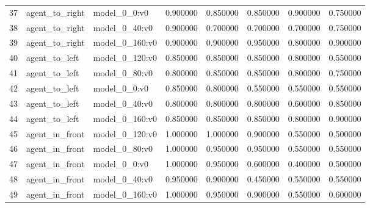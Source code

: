 \begin{tabular}{lllrrrrr}
37 & agent\_to\_right & model\_0\_0:v0 & 0.900000 & 0.850000 & 0.850000 & 0.900000 & 0.750000 \\
38 & agent\_to\_right & model\_0\_40:v0 & 0.900000 & 0.700000 & 0.700000 & 0.700000 & 0.750000 \\
39 & agent\_to\_right & model\_0\_160:v0 & 0.900000 & 0.900000 & 0.950000 & 0.800000 & 0.900000 \\
40 & agent\_to\_left & model\_0\_120:v0 & 0.850000 & 0.850000 & 0.850000 & 0.800000 & 0.550000 \\
41 & agent\_to\_left & model\_0\_80:v0 & 0.800000 & 0.850000 & 0.850000 & 0.800000 & 0.750000 \\
42 & agent\_to\_left & model\_0\_0:v0 & 0.850000 & 0.800000 & 0.550000 & 0.550000 & 0.550000 \\
43 & agent\_to\_left & model\_0\_40:v0 & 0.800000 & 0.800000 & 0.800000 & 0.600000 & 0.850000 \\
44 & agent\_to\_left & model\_0\_160:v0 & 0.850000 & 0.850000 & 0.850000 & 0.800000 & 0.900000 \\
45 & agent\_in\_front & model\_0\_120:v0 & 1.000000 & 1.000000 & 0.900000 & 0.550000 & 0.500000 \\
46 & agent\_in\_front & model\_0\_80:v0 & 1.000000 & 0.950000 & 0.950000 & 0.550000 & 0.550000 \\
47 & agent\_in\_front & model\_0\_0:v0 & 1.000000 & 0.950000 & 0.600000 & 0.400000 & 0.500000 \\
48 & agent\_in\_front & model\_0\_40:v0 & 0.950000 & 0.900000 & 0.450000 & 0.550000 & 0.550000 \\
49 & agent\_in\_front & model\_0\_160:v0 & 1.000000 & 0.950000 & 0.900000 & 0.550000 & 0.600000 \\
\bottomrule
\end{tabular}
